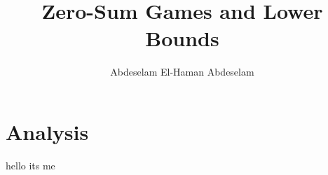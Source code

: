\documentclass[a4paper,10pt]{article}
\title{Zero-Sum Games and Lower Bounds}
\author{Abdeselam El-Haman Abdeselam}
\begin{document}
\sloppy
\maketitle


\section{Analysis}
hello its me
\end{document}
